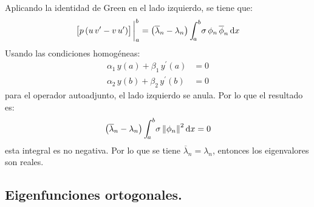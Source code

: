 \documentclass[12pt]{article}
\newcommand{\ptilde}[1]{\ensuremath{{#1}^{\prime}}}
\newcommand{\pderivada}[1]{\ensuremath{{#1}^{\prime}}}
\def\scaleint#1{\vcenter{\hbox{\scaleto[3ex]{\displaystyle\int}{#1}}}}
\def\bs{\mkern-12mu}
\numberwithin{equation}{section}
\begin{document}
Aplicando la identidad de Green en el lado izquierdo, se tiene que:
\begin{align*}
\big[ p \, (u \, \pderivada{v} - v \, \pderivada{u}) \big]\eval_{a}^{b} = \big( \overline{\lambda}_{n} - \lambda_{n} \big) \, \scaleint{5ex}_{\bs a}^{b} \sigma \, \phi_{n} \, \overline{\phi}_{n} \dd{x}
\end{align*}
Usando las condiciones homogéneas:
\begin{align*}
\alpha_{1} \, y (a) + \beta_{1} \, \ptilde{y} (a) &= 0 \\[0.5em]
\alpha_{2} \, y (b) + \beta_{2} \, \ptilde{y} (b) &= 0
\end{align*}
para el operador autoadjunto, el lado izquierdo se anula. Por lo que el resultado es:
\begin{align*}
\big( \overline{\lambda}_{n} - \lambda_{n} \big) \, \scaleint{5ex}_{\bs a}^{b} \sigma \, \norm{\phi_{n}}^{2} \dd{x} = 0
\end{align*}
esta integral es no negativa. Por lo que se tiene $\overline{\lambda}_{n} = \lambda_{n}$, entonces los eigenvalores son reales.

\subsection{Eigenfunciones ortogonales.}
\end{document}
